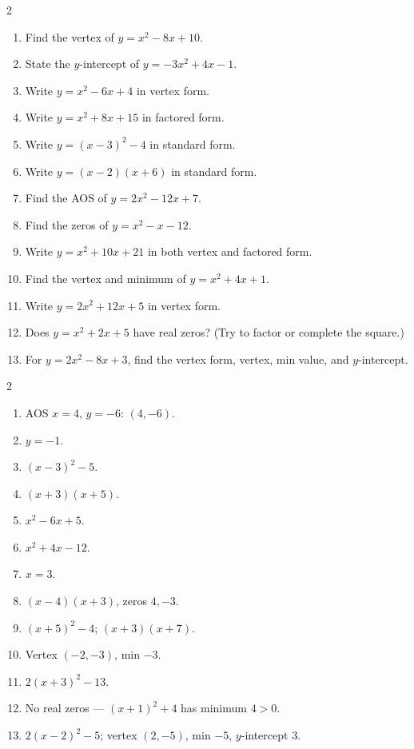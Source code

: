 \documentclass[11pt]{article}
\begin{document}
\begin{recapbox}
\begin{multicols}{2}
\small
\begin{enumerate}[leftmargin=*,itemsep=3pt]
  \item Find the vertex of $y=x^2-8x+10$.
  \item State the $y$-intercept of $y=-3x^2+4x-1$.
  \item Write $y=x^2-6x+4$ in vertex form.
  \item Write $y=x^2+8x+15$ in factored form.
  \item Write $y=(x-3)^2-4$ in standard form.
  \item Write $y=(x-2)(x+6)$ in standard form.
  \item Find the AOS of $y=2x^2-12x+7$.
  \item Find the zeros of $y=x^2-x-12$.
  \item Write $y=x^2+10x+21$ in both vertex and factored form.
  \item Find the vertex and minimum of $y=x^2+4x+1$.
  \item Write $y=2x^2+12x+5$ in vertex form.
  \item Does $y=x^2+2x+5$ have real zeros? (Try to factor or complete the square.)
  \item For $y=2x^2-8x+3$, find the vertex form, vertex, min value, and $y$-intercept.
\end{enumerate}
\end{multicols}
\end{recapbox}

\begin{keybox}
\begin{multicols}{2}
\small
\begin{enumerate}[leftmargin=*,itemsep=3pt]
  \item AOS $x=4$, $y=-6$: $(4,-6)$.
  \item $y=-1$.
  \item $(x-3)^2-5$.
  \item $(x+3)(x+5)$.
  \item $x^2-6x+5$.
  \item $x^2+4x-12$.
  \item $x=3$.
  \item $(x-4)(x+3)$, zeros $4,-3$.
  \item $(x+5)^2-4$; $(x+3)(x+7)$.
  \item Vertex $(-2,-3)$, min $-3$.
  \item $2(x+3)^2-13$.
  \item No real zeros --- $(x+1)^2+4$ has minimum $4>0$.
  \item $2(x-2)^2-5$; vertex $(2,-5)$, min $-5$, $y$-intercept $3$.
\end{enumerate}
\end{multicols}
\end{keybox}
\end{document}
